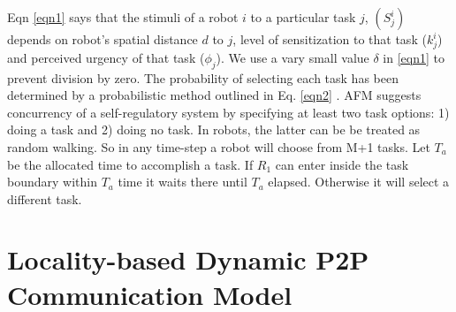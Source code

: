 \documentclass[letterpaper, 10 pt, conference]{ieeeconf}  %
\begin{document}
Eqn \ref{eqn1} says that the stimuli of a robot $i$ to a particular task $j$, $(S_{j}^{i})$ depends on robot's spatial distance $d$ to $j$, level of sensitization to that task ($k_{j}^{i}$) and perceived urgency of that task ($\phi _{j}$). We use a vary small value $\delta$ in \ref{eqn1} to prevent  division by zero. The probability of selecting each task has been determined by a probabilistic method outlined in Eq. \ref{eqn2} . 
AFM suggests concurrency of a self-regulatory system by specifying at least two task options: 1) doing a task and 2) doing no task. In robots, the latter can be   be treated as random walking. So in any time-step a robot will choose from M+1 tasks. Let $T_a$ be the allocated time to accomplish a task. If $R_1$ can enter inside the task boundary within $T_a$ time it waits there until $T_a$ elapsed. Otherwise it will select a different task. 
\section{Locality-based Dynamic P2P Communication Model}
\label{sec:comm}
\end{document}
